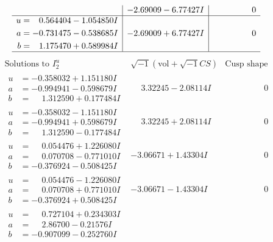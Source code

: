 \documentclass[1p]{elsarticle_modified}
\theoremstyle{definition}
\newcommand{\I}{\sqrt{-1}}
\begin{document}
$$\begin{array}{c|c|c}
 & -2.69009 - 6.77427 I & \phantom{-0.000000 } 0 \\ \hline\begin{aligned}
u &= \phantom{-}0.564404 - 1.054850 I \\
a &= -0.731475 - 0.538685 I \\
b &= \phantom{-}1.175470 + 0.589984 I\end{aligned}
 & -2.69009 + 6.77427 I & \phantom{-0.000000 } 0\\
 \hline 
 \end{array}$$\newpage$$\begin{array}{c|c|c}  
\text{Solutions to }I^u_{2}& \I (\text{vol} + \sqrt{-1}CS) & \text{Cusp shape}\\
 \hline 
\begin{aligned}
u &= -0.358032 + 1.151180 I \\
a &= -0.994941 - 0.598679 I \\
b &= \phantom{-}1.312590 + 0.177484 I\end{aligned}
 & \phantom{-}3.32245 - 2.08114 I & \phantom{-0.000000 } 0 \\ \hline\begin{aligned}
u &= -0.358032 - 1.151180 I \\
a &= -0.994941 + 0.598679 I \\
b &= \phantom{-}1.312590 - 0.177484 I\end{aligned}
 & \phantom{-}3.32245 + 2.08114 I & \phantom{-0.000000 } 0 \\ \hline\begin{aligned}
u &= \phantom{-}0.054476 + 1.226080 I \\
a &= \phantom{-}0.070708 - 0.771010 I \\
b &= -0.376924 - 0.508425 I\end{aligned}
 & -3.06671 + 1.43304 I & \phantom{-0.000000 } 0 \\ \hline\begin{aligned}
u &= \phantom{-}0.054476 - 1.226080 I \\
a &= \phantom{-}0.070708 + 0.771010 I \\
b &= -0.376924 + 0.508425 I\end{aligned}
 & -3.06671 - 1.43304 I & \phantom{-0.000000 } 0 \\ \hline\begin{aligned}
u &= \phantom{-}0.727104 + 0.234303 I \\
a &= \phantom{-}2.86700 - 0.21576 I \\
b &= -0.907099 - 0.252760 I\end{aligned}

\end{array}$$
\end{document}
